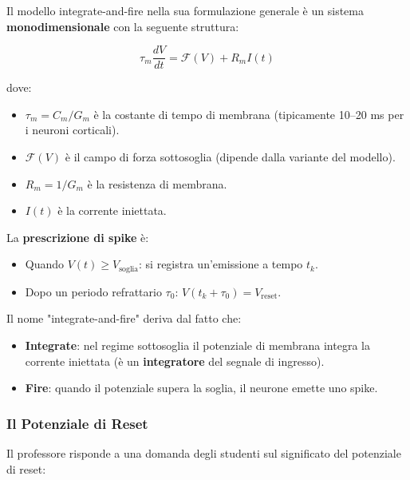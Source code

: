 Il modello integrate-and-fire nella sua formulazione generale è un sistema \textbf{monodimensionale} con la seguente struttura:

\begin{equation}
\tau_m \frac{dV}{dt} = \mathcal{F}(V) + R_m I(t)
\end{equation}

dove:
\begin{itemize}
    \item $\tau_m = C_m / G_m$ è la costante di tempo di membrana (tipicamente 10–20 ms per i neuroni corticali).
    \item $\mathcal{F}(V)$ è il campo di forza sottosoglia (dipende dalla variante del modello).
    \item $R_m = 1/G_m$ è la resistenza di membrana.
    \item $I(t)$ è la corrente iniettata.
\end{itemize}

La \textbf{prescrizione di spike} è:
\begin{itemize}
    \item Quando $V(t) \geq V_{\text{soglia}}$: si registra un'emissione a tempo $t_k$.
    \item Dopo un periodo refrattario $\tau_0$: $V(t_k + \tau_0) = V_{\text{reset}}$.
\end{itemize}

Il nome "integrate-and-fire" deriva dal fatto che:
\begin{itemize}
    \item \textbf{Integrate}: nel regime sottosoglia il potenziale di membrana integra la corrente iniettata (è un \textbf{integratore} del segnale di ingresso).
    \item \textbf{Fire}: quando il potenziale supera la soglia, il neurone emette uno spike.
\end{itemize}

\subsubsection{Il Potenziale di Reset}

Il professore risponde a una domanda degli studenti sul significato del potenziale di reset:

